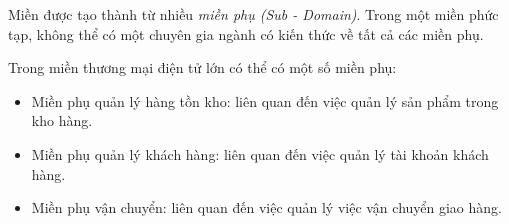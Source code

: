 Miền được tạo thành từ nhiều \emph{miền phụ (Sub - Domain)}. Trong một miền phức tạp, không thể có một chuyên gia ngành có kiến thức về tất cả các miền phụ.

\begin{example} Trong miền thương mại điện tử lớn có thể có một số miền phụ:

\begin{itemize}

\item Miền phụ quản lý hàng tồn kho: liên quan đến việc quản lý sản phẩm trong kho hàng.

\item Miền phụ quản lý khách hàng: liên quan đến việc quản lý tài khoản khách hàng.

\item Miền phụ vận chuyển: liên quan đến việc quản lý việc vận chuyển giao hàng.

\end{itemize}

\end{example}

